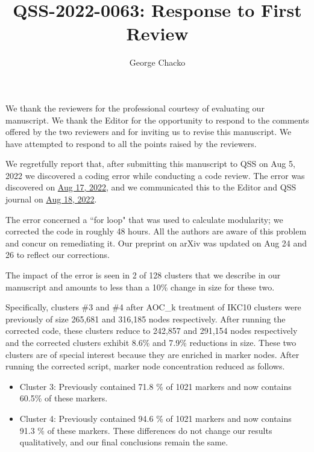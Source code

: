 \documentclass[11pt, oneside]{article}   	%
\title{QSS-2022-0063: Response to First Review}
\author{George Chacko}
\begin{document}
\maketitle
\section*{}

We thank the reviewers for the professional courtesy of evaluating our manuscript. We thank the Editor for the opportunity to respond to the comments 
offered by the two reviewers and for inviting us to revise this manuscript. We have attempted to respond to all the points raised by the reviewers.

We regretfully report that, after submitting this manuscript to QSS on Aug 5, 2022 we discovered a coding error while conducting a code review. The error was discovered 
on \underline{Aug 17, 2022},  and we communicated this to the Editor and QSS journal on \underline{Aug 18, 2022}. 

The error concerned a ``for loop" that was used to calculate modularity; we corrected the code in roughly 48 hours. All the authors are aware of this problem and 
concur on remediating it. Our preprint on arXiv was updated on Aug 24 and 26 to reflect our corrections. 

The impact of the error is seen in 2 of 128 clusters  that we describe in our manuscript and amounts to less than a 10\% change in size for these two.
 
Specifically, clusters \#3 and \#4 after AOC\_k treatment of IKC10 clusters were previously of size 265,681 and 316,185 nodes respectively. After running the corrected code, these
clusters reduce to 242,857 and 291,154 nodes respectively and the corrected clusters exhibit 8.6\% and 7.9\% reductions in size. These two clusters are of special interest because 
they are  enriched in marker nodes. After running the corrected script, marker node concentration reduced as follows. 


\begin{itemize}
\item Cluster 3: Previously contained 71.8 \% of 1021 markers and now contains 60.5\% of these markers.
\item Cluster 4: Previously contained 94.6 \% of 1021 markers and now contains 91.3 \% of these markers. These differences do not change our results qualitatively, and our final conclusions remain the same. 
\end{itemize}
\end{document}
